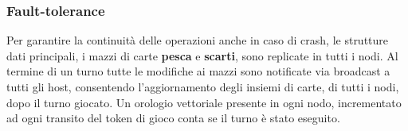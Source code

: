 \documentclass[10pt,a4paper]{article}
\begin{document}
\subsubsection{Fault-tolerance}
Per garantire la continuità delle operazioni anche in caso di crash, le strutture dati principali, i mazzi di carte \textbf{pesca} e \textbf{scarti}, sono replicate in tutti i nodi. Al termine di un turno tutte le modifiche ai mazzi sono notificate via broadcast a tutti gli host, consentendo l'aggiornamento degli insiemi di carte, di tutti i nodi, dopo il turno giocato. Un orologio vettoriale presente in ogni nodo, incrementato ad ogni transito del token di gioco conta se il turno è stato eseguito. 


\end{document}
